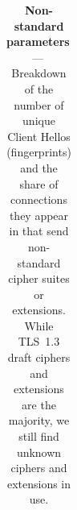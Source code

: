 {\begin{table}
{\begin{tabular}{ l  c  c }

    \end{tabular}
    }
    \caption{\textbf{Non-standard parameters}\,---\,
            Breakdown of the number of unique Client Hellos (fingerprints) and
            the share of connections they appear in that send non-standard cipher
            suites or extensions. While TLS~1.3 draft ciphers and extensions are
    the majority, we still find unknown ciphers and extensions in use.}
    \label{tab:invalid}
\end{table}
}

